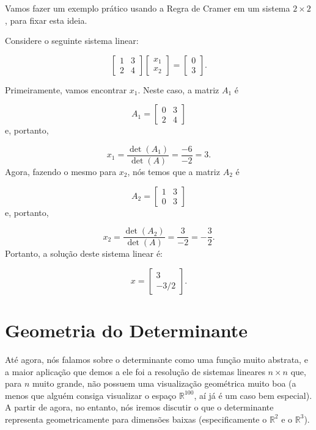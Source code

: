 Vamos fazer um exemplo prático usando a Regra de Cramer em um sistema $2\times 2$, para fixar esta ideia.

\begin{Example}
	Considere o seguinte sistema linear:
	
	$$
	\begin{bmatrix}
		1 & 3 \\
		2 & 4
	\end{bmatrix}\begin{bmatrix}
		x_1 \\
		x_2
	\end{bmatrix} = \begin{bmatrix}
		0 \\
		3
	\end{bmatrix}.
	$$
	
	Primeiramente, vamos encontrar $x_1$. Neste caso, a matriz $A_1$ é
	
	$$
	A_1 = \begin{bmatrix}
		0 & 3 \\
		2 & 4
	\end{bmatrix}
	$$
	e, portanto,
	
	$$
	x_1 = \dfrac{\det(A_1)}{\det(A)} = \dfrac{-6}{-2} = 3.
	$$
	Agora, fazendo o mesmo para $x_2$, nós temos que a matriz $A_2$ é
	
	$$
	A_2 = \begin{bmatrix}
		1 & 3 \\
		0 & 3
	\end{bmatrix}
	$$
	e, portanto, 
	
	$$
	x_2 = \dfrac{\det(A_2)}{\det(A)} = \dfrac{3}{-2} = -\dfrac{3}{2}.
	$$
	Portanto, a solução deste sistema linear é:
	
	$$
	x = \begin{bmatrix}
		3 \\
		-3/2
	\end{bmatrix}.
	$$
\end{Example}

\section{Geometria do Determinante}

Até agora, nós falamos sobre o determinante como uma função muito abstrata, e a maior aplicação que demos a ele foi a resolução de sistemas lineares $n\times n$ que, para $n$ muito grande, não possuem uma visualização geométrica muito boa (a menos que alguém consiga visualizar o espaço $\mathbb{R}^{100}$, aí já é um caso bem especial). A partir de agora, no entanto, nós iremos discutir o que o determinante representa geometricamente para dimensões baixas (especificamente o $\mathbb{R}^2$ e o $\mathbb{R}^3$).

